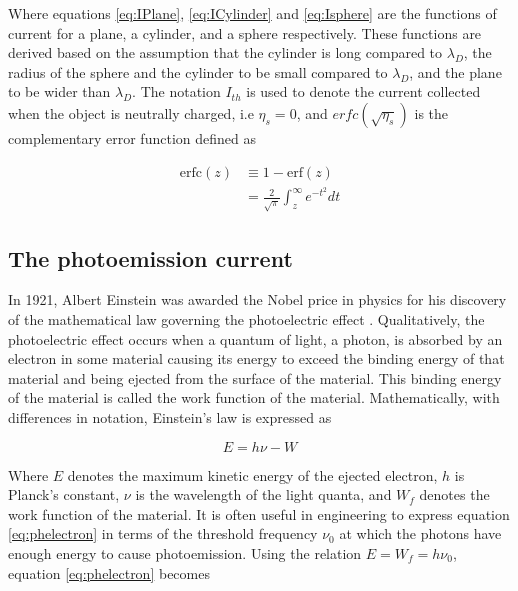 Where equations \ref{eq:IPlane}, \ref{eq:ICylinder} and \ref{eq:Isphere} are the functions of current for a plane, a cylinder, and a sphere respectively. These functions are derived based on the assumption that the cylinder is long compared to $\lambda_D$, the radius of the sphere and the cylinder to be small compared to $\lambda_D$, and the plane to be wider than $\lambda_D$. The notation $I_{th}$ is used to denote the current collected when the object is neutrally charged, i.e $\eta_s = 0$, and $erfc(\sqrt{\eta_s})$ is the complementary error function defined as

\begin{subequations}
    \begin{align*}
        \text{erfc}(z) &\equiv 1 - \text{erf}(z) \\
        &= \frac{2}{\sqrt{\pi}} \int^\infty_z e^{-t^2} dt
    \end{align*}
\end{subequations}


\subsection*{The photoemission current}
In 1921, Albert Einstein was awarded the Nobel price in physics for his discovery of the mathematical law governing the photoelectric effect . Qualitatively, the photoelectric effect occurs when a quantum of light, a photon, is absorbed by an electron in some material causing its energy to exceed the binding energy of that material and being ejected from the surface of the material. This binding energy of the material is called the work function of the material. Mathematically, with differences in notation, Einstein's law is expressed as 

\begin{equation}\label{eq:phelectron}
    E = h \nu - W
\end{equation}

Where $E$ denotes the maximum kinetic energy of the ejected electron, $h$ is Planck's constant, $\nu$ is the wavelength of the light quanta, and $W_f$ denotes the work function of the material. It is often useful in engineering to express equation \ref{eq:phelectron} in terms of the threshold frequency $\nu_0$ at which the photons have enough energy to cause photoemission. Using the relation $E = W_f = h \nu_0$, equation \ref{eq:phelectron} becomes

